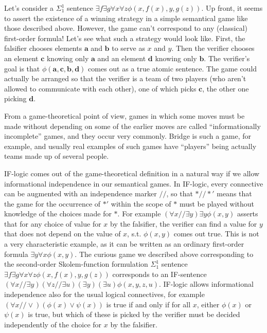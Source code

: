 \documentclass[12pt]{article}
\begin{document}
Let's consider a $\Sigma^1_1$ sentence $\exists f \exists g \forall x \forall z \phi(x, f(x),y,g(z))$. Up front, it seems to assert the existence of a winning strategy in a simple semantical game like those described above. However, the game can't correspond to any (classical) first-order formula! Let's see what such a strategy would look like. First, the falsifier chooses elements $\mathbf{a}$ and $\mathbf{b}$ to serve as $x$ and $y$. Then the verifier chooses an element $\mathbf{c}$ knowing only $\mathbf{a}$ and an element $\mathbf{d}$ knowing only $\mathbf{b}$. The verifier's goal is that $\phi(\mathbf{a},\mathbf{c},\mathbf{b},\mathbf{d})$ comes out as a true atomic sentence. The game could actually be arranged so that the verifier is a team of two players (who aren't allowed to communicate with each other), one of which picks $\mathbf{c}$, the other one picking $\mathbf{d}$.

From a game-theoretical point of view, games in which some moves must be made without depending on some of the earlier moves are called ``informationally incomplete'' games, and they occur very commonly. Bridge is such a game, for example, and usually real examples of such games have ``players'' being actually teams made up of several people.

IF-logic comes out of the game-theoretical definition in a natural way if we allow informational independence in our semantical games. In IF-logic, every connective can be augmented with an independence marker $//$, so that $*//*'$ means that the game for the occurrence of $*'$ within the scope of $*$ must be played without knowledge of the choices made for $*$. For example $(\forall x // \exists y) \exists y \phi(x,y)$ asserts that for any choice of value for $x$ by the falsifier, the verifier can find a value for $y$ that does not depend on the value of $x$, s.t. $\phi(x,y)$ comes out true. This is not a very characteristic example, as it can be written as an ordinary first-order formula $\exists y \forall x \phi(x,y)$. The curious game we described above corresponding to the second-order Skolem-function formulation $\Sigma^1_1$ sentence $\exists f \exists g \forall x \forall z \phi(x, f(x),y,g(z))$ corresponds to an IF-sentence $(\forall x // \exists y)(\forall z // \exists u)(\exists y)(\exists u)\phi(x,y,z,u)$. IF-logic allows informational independence also for the usual logical connectives, for example $(\forall x // \vee)(\phi(x) \vee \psi(x))$ is true if and only if for all $x$, either $\phi(x)$ or $\psi(x)$ is true, but which of these is picked by the verifier must be decided independently of the choice for $x$ by the falsifier.
\end{document}
